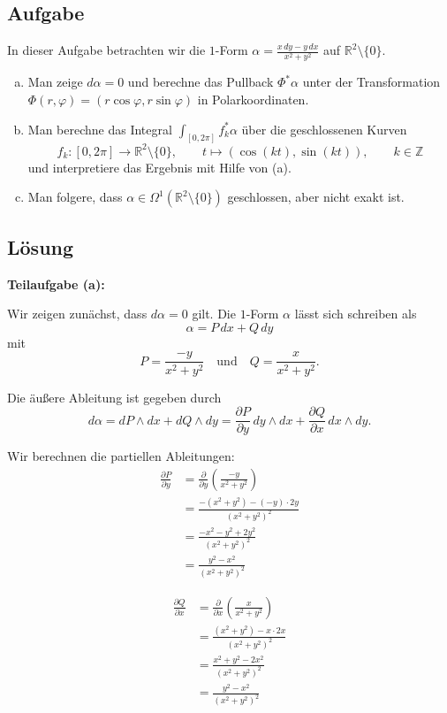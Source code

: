 \documentclass{article}
\newcommand{\R}{\mathbb{R}}
\newcommand{\Z}{\mathbb{Z}}
\begin{document}
\subsection*{Aufgabe}
In dieser Aufgabe betrachten wir die $1$-Form $\alpha = \frac{x\,dy - y\,dx}{x^2+y^2}$ auf $\R^2 \setminus \{0\}$. 

\begin{enumerate}[(a)]
    \item Man zeige $d\alpha=0$ und berechne das Pullback $\Phi^*\alpha$ unter
    der Transformation $\Phi(r,\varphi)=(r\cos\varphi,r\sin\varphi)$ in
    Polarkoordinaten.
    \item Man berechne das Integral $\int_{[0,2\pi]}f_k^*\alpha$ über die geschlossenen Kurven
    $$
    f_k \colon [0,2\pi] \to \R^2 \setminus \{0\}, \qquad
    t \mapsto (\cos(kt), \sin(kt)), \qquad k \in \Z
    $$
    und interpretiere das Ergebnis mit Hilfe von (a). 
    \item Man folgere, dass $\alpha \in \Omega^1(\R^2 \setminus \{0\} )$ geschlossen, aber nicht exakt ist. 
\end{enumerate}

\subsection*{Lösung}

\textbf{Teilaufgabe (a):}

Wir zeigen zunächst, dass $d\alpha = 0$ gilt. Die $1$-Form $\alpha$ lässt sich schreiben als
$$\alpha = P\,dx + Q\,dy$$
mit 
$$P = \frac{-y}{x^2+y^2} \quad \text{und} \quad Q = \frac{x}{x^2+y^2}.$$

Die äußere Ableitung ist gegeben durch
$$d\alpha = dP \wedge dx + dQ \wedge dy = \frac{\partial P}{\partial y}\,dy \wedge dx + \frac{\partial Q}{\partial x}\,dx \wedge dy.$$

Wir berechnen die partiellen Ableitungen:
\begin{align}
\frac{\partial P}{\partial y} &= \frac{\partial}{\partial y}\left(\frac{-y}{x^2+y^2}\right) \\
&= \frac{-(x^2+y^2) - (-y) \cdot 2y}{(x^2+y^2)^2} \\
&= \frac{-x^2-y^2+2y^2}{(x^2+y^2)^2} \\
&= \frac{y^2-x^2}{(x^2+y^2)^2}
\end{align}

\begin{align}
\frac{\partial Q}{\partial x} &= \frac{\partial}{\partial x}\left(\frac{x}{x^2+y^2}\right) \\
&= \frac{(x^2+y^2) - x \cdot 2x}{(x^2+y^2)^2} \\
&= \frac{x^2+y^2-2x^2}{(x^2+y^2)^2} \\
&= \frac{y^2-x^2}{(x^2+y^2)^2}
\end{align}
\end{document}
